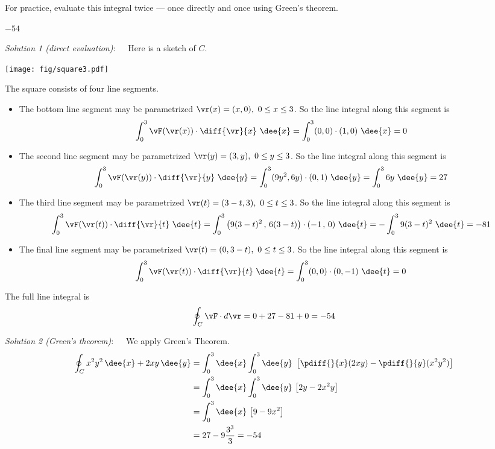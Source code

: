 \begin{hint}
For practice, evaluate this integral twice --- once directly and once
using Green's theorem.
\end{hint}

\begin{answer}
$-54$
\end{answer}


\begin{solution}
\emph{Solution 1 (direct evaluation)}:\ \ \
Here is a sketch of $C$.
\begin{center}
     \texttt{[image: fig/square3.pdf]}
\end{center}
The square consists of four line segments.
\begin{itemize}\itemsep1pt \parskip0pt  %
\item
The bottom line segment may be parametrized
$\vr(x)=(x,0),\ 0\le x\le 3$. So the line integral along
this segment is
\begin{equation*}
\int_0^3 \vF(\vr(x))\cdot\diff{\vr}{x}\ \dee{x}
=\int_0^3 (0, 0)\cdot(1, 0)\ \dee{x}
=0
\end{equation*}
\item
The second line segment may be parametrized
$\vr(y)=(3,y),\ 0\le y\le 3$. So the line integral along
this segment is
\begin{equation*}
\int_0^3 \vF(\vr(y))\cdot\diff{\vr}{y}\ \dee{y}
=\int_0^3 (9y^2, 6y)\cdot(0, 1)\ \dee{y}
=\int_0^3 6y\ \dee{y}
=27
\end{equation*}
\item
The third line segment may be parametrized
$\vr(t)=(3-t,3),\ 0\le t\le 3$. So the line integral along
this segment is
\begin{equation*}
\int_0^3 \vF(\vr(t))\cdot\diff{\vr}{t}\ \dee{t}
=\int_0^3 \big(9(3-t)^2\,,\, 6(3-t)\big)\cdot(-1\,,\,0)\ \dee{t}
=-\int_0^3 9(3-t)^2\ \dee{t}
=-81
\end{equation*}
\item
The final line segment may be parametrized
$\vr(t)=(0,3-t),\ 0\le t\le 3$. So the line integral along
this segment is
\begin{equation*}
\int_0^3 \vF(\vr(t))\cdot\diff{\vr}{t}\ \dee{t}
=\int_0^3 (0, 0)\cdot(0, -1)\ \dee{t}
=0
\end{equation*}
\end{itemize}
The full line integral is
\begin{equation*}
\oint_C\vF\cdot d\vr=0+27-81+0=-54
\end{equation*}


\emph{Solution 2 (Green's theorem)}:\ \ \
 We apply Green's Theorem.
\begin{align*}
\oint_C x^2y^2\,\dee{x}+2xy\,\dee{y}
&=\int_0^3\dee{x}\int_0^3 \dee{y}\
            \left[\pdiff{}{x}(2xy)-\pdiff{}{y}(x^2y^2)\right]\\
&=\int_0^3\dee{x}\int_0^3 \dee{y}\ \big[2y-2x^2y\big]\\
&=\int_0^3\dee{x}\ \big[9-9x^2\big]\\
&=27-9\frac{3^3}{3}=-54
\end{align*}
\end{solution}



